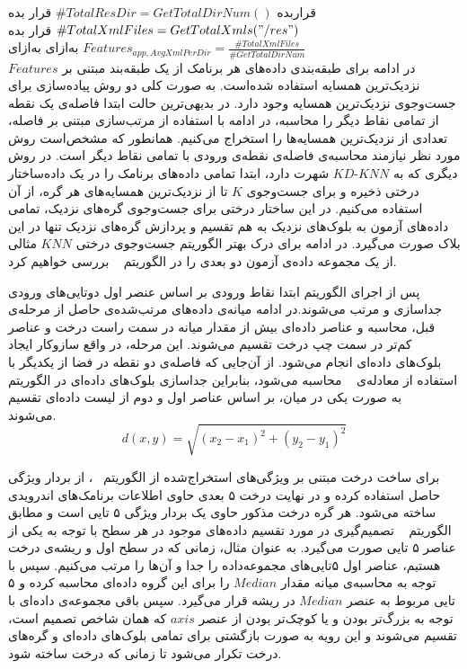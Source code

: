  قرار‌بده $\#TotalResDir = GetTotalDirNum()$
 قرار بده $\#TotalXmlFiles = GetTotalXmls("/res")$
 قرار بده $Features_{app,AvgXmlPerDir}=  \frac{\#TotalXmlFiles}{\#GetTotalDirNum}$
‌به‌ازای
‌به‌ازای\\
 $Features$
در ادامه برای طبقه‌بندی داده‌های هر برنامک از یک طبقه‌بند مبتنی بر نزدیک‌ترین همسایه‌ استفاده ‌شده‌است. به صورت کلی دو روش پیاده‌سازی برای جست‌و‌جوی نزدیک‌ترین همسایه وجود دارد. در بدیهی‌ترین حالت ابتدا فاصله‌ی یک نقطه از تمامی نقاط‌ دیگر را محاسبه، در ادامه با استفاده از مرتب‌سازی مبتنی بر فاصله، تعدادی از نزدیک‌ترین همسایه‌ها را استخراج می‌کنیم. همانطور که مشخص‌است روش مورد نظر نیازمند محاسبه‌ی فاصله‌ی نقطه‌ی ورودی با تمامی نقاط دیگر ‌است. در روش دیگری که به $KD\text{-}KNN$ شهرت دارد، ابتدا تمامی داده‌های برنامک را در یک داده‌ساختار درختی ذخیره و برای جست‌و‌جوی $K$ تا از نزدیک‌ترین همسایه‌های هر گره، از آن استفاده می‌کنیم. در این ساختار درختی برای جست‌و‌جوی گره‌های نزدیک، تمامی داده‌های آزمون به بلوک‌های نزدیک به هم تقسیم و پردازش گره‌های نزدیک‌ تنها در این بلاک صورت می‌گیرد. در ادامه برای درک بهتر الگوریتم جست‌و‌جوی درختی $KNN$ مثالی از یک مجموعه‌ داده‌ی آزمون دو بعدی را در الگوریتم ~ بررسی خواهیم کرد. 

پس از اجرای الگوریتم ابتدا نقاط ورودی بر اساس عنصر اول دوتایی‌های ورودی جداسازی و مرتب‌ می‌شوند.در ادامه میانه‌ی داده‌‌های مرتب‌شده‌ی حاصل از مرحله‌ی قبل، محاسبه و عناصر داده‌ای بیش از مقدار میانه در سمت راست درخت و عناصر کم‌تر در سمت چپ درخت تقسیم می‌شوند. این مرحله‌، در واقع سازو‌کار ایجاد بلوک‌های داده‌ای انجام می‌شود. از آن‌جایی که فاصله‌ی دو نقطه در فضا از یکدیگر با استفاده از معادله‌ی ~ محاسبه می‌شود، بنابراین جداسازی بلوک‌های داده‌ای در الگوریتم ~ به صورت یکی در میان، بر اساس عناصر اول و دوم از لیست داده‌ای تقسیم می‌شوند.
\begin{equation}
	d(x,y)=\sqrt{(x_{2}-x_{1})^2 + (y_{2}-y_{1})^2} \label{eq:1}
\end{equation}

برای ساخت درخت مبتنی بر ویژگی‌های استخراج‌شده از الگوریتم ~، از بردار ویژگی حاصل استفاده کرده و در نهایت درخت ۵ بعدی حاوی اطلاعات برنامک‌های اندرویدی ساخته می‌شود. هر گره درخت مذکور حاوی یک بردار ویژگی ۵ تایی است و مطابق الگوریتم ~ تصمیم‌گیری در مورد تقسیم داده‌های موجود در هر سطح با توجه به یکی از عناصر ۵ تایی صورت می‌گیرد. به عنوان مثال، زمانی که در سطح اول و ریشه‌ی درخت هستیم، عناصر اول ۵‌تایی‌های مجموعه‌داده را جدا و آن‌ها را مرتب می‌کنیم. سپس با توجه به محاسبه‌ی میانه مقدار $Median$ را برای این گروه داده‌ای محاسبه کرده و ۵ تایی مربوط به عنصر $Median$ در ریشه قرار می‌گیرد. سپس باقی مجموعه‌ی داده‌ای با توجه به بزرگ‌تر بودن و یا کوچک‌تر بودن از عنصر  $axis$ که همان شاخص تصمیم است، تقسیم می‌شوند و این رویه به صورت بازگشتی برای تمامی بلوک‌های داده‌ای و گره‌های درخت تکرار می‌شود تا زمانی که درخت ساخته شود.

